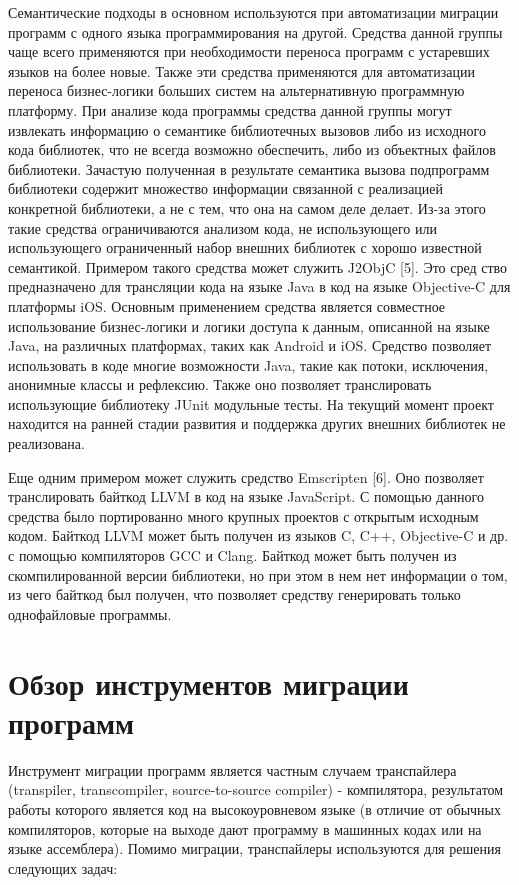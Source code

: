 Семантические подходы в основном используются при автоматизации миграции программ с одного языка программирования на другой. Средства данной группы чаще всего применяются при необходимости переноса программ с устаревших языков на более новые. Также эти средства применяются для автоматизации переноса бизнес-логики больших систем на альтернативную программную платформу.
При анализе кода программы средства данной группы могут извлекать информацию о семантике библиотечных вызовов либо из исходного кода библиотек, что не всегда возможно обеспечить, либо из объектных файлов библиотеки. Зачастую полученная в результате семантика вызова подпрограмм библиотеки содержит множество информации связанной с реализацией конкретной библиотеки, а не с тем, что она на самом деле делает. Из-за этого такие средства ограничиваются анализом кода, не использующего или использующего ограниченный набор внешних библиотек с хорошо известной семантикой. Примером такого средства может служить J2ObjC [5]. Это сред ство предназначено для трансляции кода на языке Java в код на языке Objective-C для платформы iOS. Основным применением средства является совместное использование бизнес-логики и логики доступа к данным, описанной на языке Java, на различных платформах, таких как Android и iOS. Средство позволяет использовать в коде многие возможности Java, такие как потоки, исключения, анонимные классы и рефлексию. Также оно позволяет транслировать использующие библиотеку JUnit модульные тесты. На текущий момент проект находится на ранней стадии развития и поддержка других внешних библиотек
не реализована.

Еще одним примером может служить средство Emscripten [6]. Оно позволяет транслировать байткод LLVM в код на языке JavaScript. С помощью данного средства было портированно много крупных проектов с открытым исходным кодом. Байткод LLVM может быть получен из языков C, C++, Objective-C и др. с помощью компиляторов GCC и Clang. Байткод может быть получен из скомпилированной версии библиотеки, но при этом в нем нет информации о том, из чего байткод был получен, что позволяет средству генерировать только однофайловые программы.

\section{Обзор инструментов миграции программ}
Инструмент миграции программ является частным случаем транспайлера (transpiler, transcompiler, source-to-source compiler) - компилятора, результатом работы которого является код на высокоуровневом языке (в отличие от обычных компиляторов, которые на выходе дают программу в машинных кодах или на языке ассемблера). Помимо миграции, транспайлеры используются для решения следующих задач:

